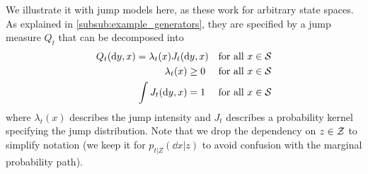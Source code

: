 \documentclass{fairmeta}
\numberwithin{equation}{section}
\begin{document}
We illustrate it with jump models here, as these work for arbitrary state spaces. As explained in \cref{subsub:example_generators}, they are specified by a jump measure $Q_t$ that can be decomposed into
\begin{align}
    Q_t(\mathrm{d} y,x) = \lambda_t(x)J_t(\mathrm{d} y,x)\quad \text{for all }x\in{\mathcal{S}}\\
    \label{eq:lambda_constraint}
    \lambda_t(x)\geq 0 \quad \text{ for all }x\in{\mathcal{S}}\\
\label{eq:J_t_constaint}
    \int J_t(\mathrm{d} y,x) = 1 \quad \text{ for all }x\in{\mathcal{S}}
\end{align}
where $\lambda_t(x)$ describes the jump intensity and $J_t$ describes a probability kernel specifying the jump distribution. Note that we drop the dependency on $z\in {\mathcal{Z}}$ to simplify notation (we keep it for $p_{t|Z}(\dd x|z)$ to avoid confusion with the marginal probability path).
\end{document}
